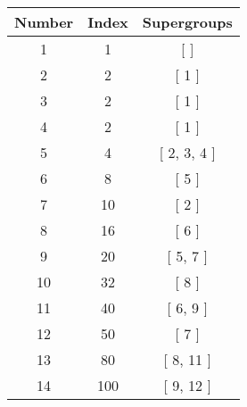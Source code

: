 \begin{center}
\begin{longtable}[H]{|| c c c ||}
\hline
Number & Index & Supergroups \\ 
\hline
1 & 1 & [  ] \\ 
\hline
2 & 2 & [ 1 ] \\ 
\hline
3 & 2 & [ 1 ] \\ 
\hline
4 & 2 & [ 1 ] \\ 
\hline
5 & 4 & [ 2, 3, 4 ] \\ 
\hline
6 & 8 & [ 5 ] \\ 
\hline
7 & 10 & [ 2 ] \\ 
\hline
8 & 16 & [ 6 ] \\ 
\hline
9 & 20 & [ 5, 7 ] \\ 
\hline
10 & 32 & [ 8 ] \\ 
\hline
11 & 40 & [ 6, 9 ] \\ 
\hline
12 & 50 & [ 7 ] \\ 
\hline
13 & 80 & [ 8, 11 ] \\ 
\hline
14 & 100 & [ 9, 12 ] \\ 
\hline
\end{longtable}
\end{center}
